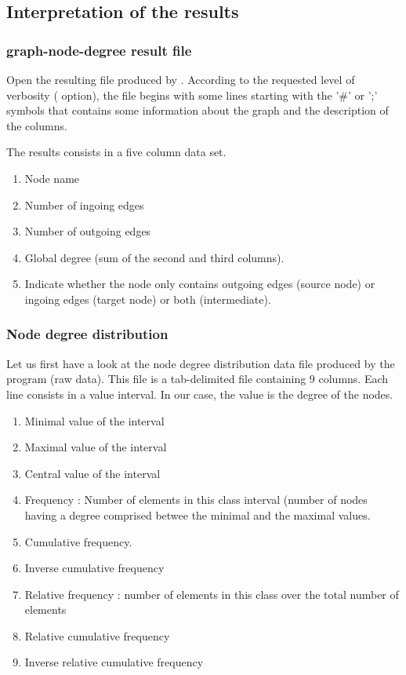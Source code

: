 \subsection{Interpretation of the results}

\subsubsection{graph-node-degree result file}
Open the resulting file produced by . 
According to the requested level of verbosity ( option), the file begins with some lines starting with the '\#' or ';' symbols that contains some information about the graph and the description of the columns.

The results consists in a five column data set.
\begin{enumerate}
 \item Node name
 \item Number of ingoing edges
 \item Number of outgoing edges
 \item Global degree (sum of the second and third columns).
 \item Indicate whether the node only contains outgoing edges (source node) or ingoing edges (target node) or both (intermediate).
\end{enumerate}

\subsubsection{Node degree distribution}
Let us first have a look at the node degree distribution data file produced by the  program (raw data). 
This file is a tab-delimited file containing 9 columns. Each line consists in a value interval. In our case,
the value is the degree of the nodes. 

\begin{enumerate}
 \item Minimal value of the interval
 \item Maximal value of the interval
 \item Central value of the interval
 \item Frequency : Number of elements in this class interval (number of nodes having a degree comprised betwee the minimal and the maximal values.
 \item Cumulative frequency.
 \item Inverse cumulative frequency
 \item Relative frequency : number of elements in this class over the total number of elements
 \item Relative cumulative frequency
 \item Inverse relative cumulative frequency
\end{enumerate}


